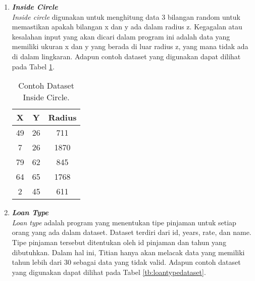 \begin{enumerate}
      \item \emph{\textbf{Inside Circle}} \\
            \emph{Inside circle} digunakan untuk menghitung data 3 bilangan random untuk memastikan apakah bilangan x dan y ada dalam radius z. Kegagalan atau kesalahan input yang akan dicari dalam program ini adalah data yang memiliki ukuran x dan y yang berada di luar radius z, yang mana tidak ada di dalam lingkaran.
            Adapun contoh dataset yang digunakan dapat 
            dilihat pada Tabel \ref{tb:insidecircledataset}.

            \begin{longtable}{|c|c|c|}
                  \caption{Contoh Dataset Inside Circle.}
                  \label{tb:insidecircledataset} \\
                  \hline
                  \rowcolor[HTML]{C0C0C0}
                  \textbf{X} & \textbf{Y} & \textbf{Radius} \\
                  \hline
                  49 & 26 & 711 \\
                  7 & 26 & 1870 \\
                  79 & 62 & 845 \\
                  64 & 65 & 1768 \\
                  2 & 45 & 611 \\
                  \hline
            \end{longtable}

      \item \emph{\textbf{Loan Type}} \\
            \emph{Loan type} adalah program yang menentukan tipe pinjaman untuk setiap orang yang ada dalam dataset. Dataset terdiri dari id, years, rate, dan name. Tipe pinjaman tersebut ditentukan oleh id pinjaman dan tahun yang dibutuhkan. Dalam hal ini, Titian hanya akan melacak data yang memiliki tahun lebih dari 30 sebagai data yang tidak valid.
            Adapun contoh dataset yang digunakan dapat 
            dilihat pada Tabel \ref{tb:loantypedataset}.


\end{enumerate}
